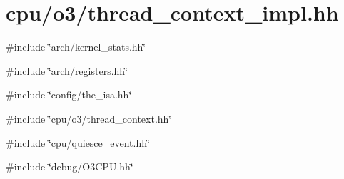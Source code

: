 \hypertarget{thread__context__impl_8hh}{
\section{cpu/o3/thread\_\-context\_\-impl.hh}
\label{thread__context__impl_8hh}
}
{\ttfamily \#include \char`\"{}arch/kernel\_\-stats.hh\char`\"{}}\par
{\ttfamily \#include \char`\"{}arch/registers.hh\char`\"{}}\par
{\ttfamily \#include \char`\"{}config/the\_\-isa.hh\char`\"{}}\par
{\ttfamily \#include \char`\"{}cpu/o3/thread\_\-context.hh\char`\"{}}\par
{\ttfamily \#include \char`\"{}cpu/quiesce\_\-event.hh\char`\"{}}\par
{\ttfamily \#include \char`\"{}debug/O3CPU.hh\char`\"{}}\par
